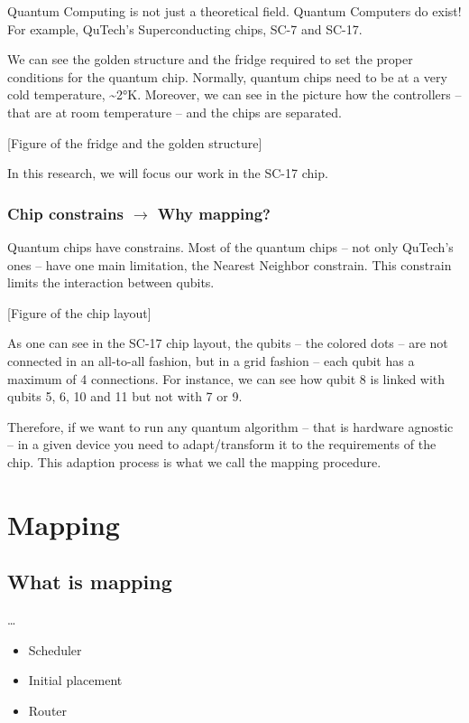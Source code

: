 \documentclass[11pt]{article}
\begin{document}
Quantum Computing is not just a theoretical field.
Quantum Computers do exist!
For example, QuTech's Superconducting chips, SC-7 and SC-17.

We can see the golden structure and the fridge required to set the proper conditions for the quantum chip.
Normally, quantum chips need to be at a very cold temperature, \textasciitilde{}2°K.
Moreover, we can see in the picture how the controllers -- that are at room temperature -- and the chips are separated.

[Figure of the fridge and the golden structure]

In this research, we will focus our work in the SC-17 chip.

\subsubsection{Chip constrains \(\to\) Why mapping?}
\label{sec:org639bdbe}

Quantum chips have constrains.
Most of the quantum chips -- not only QuTech's ones -- have one main limitation, the Nearest Neighbor constrain.
This constrain limits the interaction between qubits.

[Figure of the chip layout]

As one can see in the SC-17 chip layout, the qubits -- the colored dots -- are not connected in an all-to-all fashion, but in a grid fashion -- each qubit has a maximum of 4 connections.
For instance, we can see how qubit 8 is linked with qubits 5, 6, 10 and 11 but not with 7 or 9.

Therefore, if we want to run any quantum algorithm -- that is hardware agnostic -- in a given device you need to adapt/transform it to the requirements of the chip.
This adaption process is what we call the mapping procedure.

\section{Mapping}
\label{sec:org04d1802}
\subsection{What is mapping}
\label{sec:orgc4f2b96}

\ldots{}

\begin{itemize}
\item Scheduler
\item Initial placement
\item Router
\end{itemize}
\end{document}
